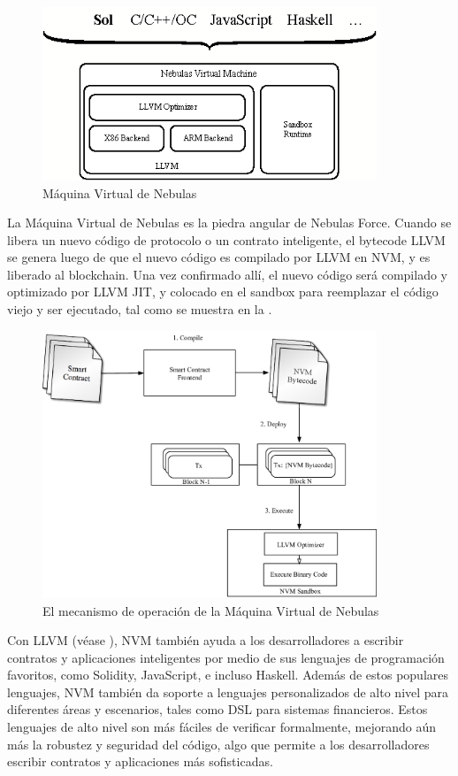 \begin{figure}[h]
\centering
\includegraphics[width=10cm]{./figs/nvm}
\caption{Máquina Virtual de Nebulas}
\label{fig:nvm}
\end{figure}

La Máquina Virtual de Nebulas es la piedra angular de Nebulas Force. Cuando se libera un nuevo código de protocolo o un contrato inteligente, el bytecode LLVM se genera luego de que el nuevo código es compilado por LLVM en NVM, y es liberado al blockchain. Una vez confirmado allí, el nuevo código será compilado y optimizado por LLVM JIT, y colocado en el sandbox para reemplazar el código viejo y ser ejecutado, tal como se muestra en la .

\begin{figure}[h]
\centering
\includegraphics[width=10cm]{./figs/nvm-process}
\caption{El mecanismo de operación de la Máquina Virtual de Nebulas}
\label{fig:nvm-process}
\end{figure}

Con LLVM (véase ), NVM también ayuda a los desarrolladores a escribir contratos y aplicaciones inteligentes por medio de sus lenguajes de programación favoritos, como Solidity, JavaScript, e incluso Haskell. Además de estos populares lenguajes, NVM también da soporte a lenguajes personalizados de alto nivel para diferentes áreas y escenarios, tales como DSL para sistemas financieros. Estos lenguajes de alto nivel son más fáciles de verificar formalmente, mejorando aún más la robustez y seguridad del código, algo que permite a los desarrolladores escribir contratos y aplicaciones más sofisticadas.